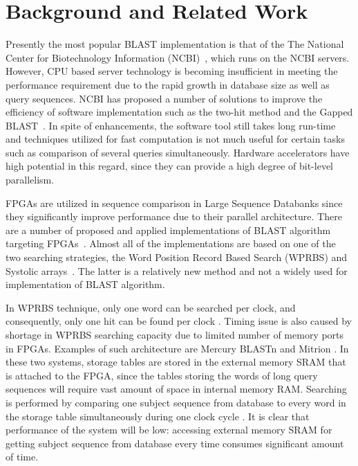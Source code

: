 \section{Background and Related Work}
\label{sec:background}


Presently the most popular BLAST implementation is that of the The National Center for Biotechnology Information (NCBI)~\cite{ncbiBlast}, which runs on the NCBI servers.
However, CPU based server technology is becoming insufficient in meeting the performance requirement due to the rapid growth in database size as well as query sequences.
NCBI has proposed a number of solutions to improve the efficiency of software implementation such as the two-hit method and the Gapped BLAST~\cite{WIENBRANDT20111967}.
In spite of enhancements, the software tool still takes long run-time and techniques utilized for fast computation is not much useful for certain tasks such as comparison of several queries simultaneously. 
Hardware accelerators have high potential in this regard, since they can provide a high degree of bit-level parallelism.

FPGAs are utilized in sequence comparison in Large Sequence Databanks since they significantly improve performance due to their parallel architecture. 
There are a number of proposed and applied implementations of BLAST algorithm targeting FPGAs~\cite{oliver2005hyper}. 
Almost all of the implementations are based on one of the two searching strategies, the Word Position Record Based Search (WPRBS) and Systolic arrays~\cite{guo2012systolic}. 
The latter is a relatively new method and not a widely used for implementation of BLAST algorithm. 

In WPRBS technique, only one word can be searched per clock, and consequently, only one hit can be found per clock \cite{guo2012open}. 
Timing issue is also caused by shortage in WPRBS searching capacity due to limited number of memory ports in FPGAs. 
Examples of such architecture are Mercury BLASTn \cite{buhler2007mercury} and Mitrion \cite{guo2012systolic}. 
In these two systems, storage tables are stored in the external memory SRAM that is attached to the FPGA, since the tables storing the words of long query sequences will require vast amount of space in internal memory RAM. 
Searching is performed by comparing one subject sequence from database to every word in the storage table simultaneously during one clock cycle \cite{guo2012systolic}. 
It is clear that performance of the system will be low: accessing external memory SRAM for getting subject sequence from database every time consumes significant amount of time. 

